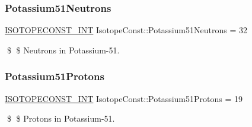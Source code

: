 \subsubsection{\texorpdfstring{Potassium51\+Neutrons}{Potassium51Neutrons}}
{\footnotesize\ttfamily \mbox{\hyperlink{group___isotope_const-_macros_ga5f18360b3e99483a35c32d789e62621c}{I\+S\+O\+T\+O\+P\+E\+C\+O\+N\+S\+T\+\_\+\+I\+NT}} Isotope\+Const\+::\+Potassium51\+Neutrons = 32}

\$ \$ Neutrons in Potassium-\/51. \mbox{\label{group___isotope_const-_potassium-_k51_ga96d453f50607bc9770c85a9c99469606}} 
\subsubsection{\texorpdfstring{Potassium51\+Protons}{Potassium51Protons}}
{\footnotesize\ttfamily \mbox{\hyperlink{group___isotope_const-_macros_ga5f18360b3e99483a35c32d789e62621c}{I\+S\+O\+T\+O\+P\+E\+C\+O\+N\+S\+T\+\_\+\+I\+NT}} Isotope\+Const\+::\+Potassium51\+Protons = 19}

\$ \$ Protons in Potassium-\/51. 